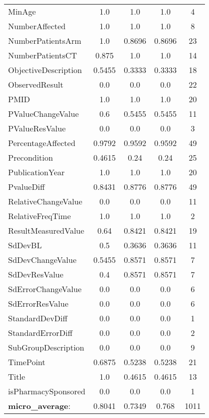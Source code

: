 \begin{longtable}{ l c c c c}
MinAge & 1.0 & 1.0 & 1.0 & 4\\
NumberAffected & 1.0 & 1.0 & 1.0 & 8\\
NumberPatientsArm & 1.0 & 0.8696 & 0.8696 & 23\\
NumberPatientsCT & 0.875 & 1.0 & 1.0 & 14\\
ObjectiveDescription & 0.5455 & 0.3333 & 0.3333 & 18\\
ObservedResult & 0.0 & 0.0 & 0.0 & 22\\
PMID & 1.0 & 1.0 & 1.0 & 20\\
PValueChangeValue & 0.6 & 0.5455 & 0.5455 & 11\\
PValueResValue & 0.0 & 0.0 & 0.0 & 3\\
PercentageAffected & 0.9792 & 0.9592 & 0.9592 & 49\\
Precondition & 0.4615 & 0.24 & 0.24 & 25\\
PublicationYear & 1.0 & 1.0 & 1.0 & 20\\
PvalueDiff & 0.8431 & 0.8776 & 0.8776 & 49\\
RelativeChangeValue & 0.0 & 0.0 & 0.0 & 11\\
RelativeFreqTime & 1.0 & 1.0 & 1.0 & 2\\
ResultMeasuredValue & 0.64 & 0.8421 & 0.8421 & 19\\
SdDevBL & 0.5 & 0.3636 & 0.3636 & 11\\
SdDevChangeValue & 0.5455 & 0.8571 & 0.8571 & 7\\
SdDevResValue & 0.4 & 0.8571 & 0.8571 & 7\\
SdErrorChangeValue & 0.0 & 0.0 & 0.0 & 6\\
SdErrorResValue & 0.0 & 0.0 & 0.0 & 6\\
StandardDevDiff & 0.0 & 0.0 & 0.0 & 1\\
StandardErrorDiff & 0.0 & 0.0 & 0.0 & 2\\
SubGroupDescription & 0.0 & 0.0 & 0.0 & 9\\
TimePoint & 0.6875 & 0.5238 & 0.5238 & 21\\
Title & 1.0 & 0.4615 & 0.4615 & 13\\
isPharmacySponsored & 0.0 & 0.0 & 0.0 & 1\\
\textbf{micro\_average}: & 0.8041 & 0.7349 & 0.768 & 1011 
\label{tab:Diabetes_eventextr}
\end{longtable}
